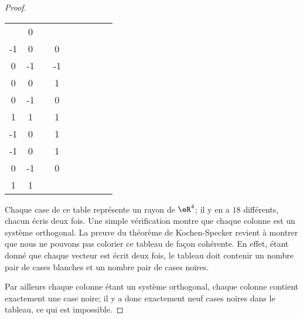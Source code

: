 \begin{proof}
\begin{tabular}{c|c|c|c|c|c|c|c|c}
\begin{matrix}
			1  & 0 \\
			-1 & 0
		\end{matrix}\)
		 &
		\( \begin{matrix}
			1 & 0  \\
			0 & -1
		\end{matrix}\)
		 &
		\( \begin{matrix}
			1 & -1 \\
			0 & 0
		\end{matrix}\)
		 &
		\( \begin{matrix}
			0 & 1  \\
			0 & -1
		\end{matrix}\)
		 &
		\( \begin{matrix}
			0 & 0 \\
			1 & 1
		\end{matrix}\)
		 &
		\( \begin{matrix}
			0  & 1 \\
			-1 & 0
		\end{matrix}\)
		 &
		\( \begin{matrix}
			0  & 1 \\
			-1 & 0
		\end{matrix}\)
		 &
		\( \begin{matrix}
			0 & 1  \\
			0 & -1
		\end{matrix}\)
		 &
		\( \begin{matrix}
			0 & 0 \\
			1 & 1
		\end{matrix}\) \\
		\hline
	\end{tabular}

	Chaque case de ce table représente un rayon de \( \eR^4\); il y en a \( 18\) différents, chacun écris deux fois. Une simple vérification montre que chaque colonne est un système orthogonal. La preuve du théorème de Kochen-Specker revient à montrer que nous ne pouvons pas colorier ce tableau de façon cohérente. En effet, étant donné que chaque vecteur est écrit deux fois, le tableau doit contenir un nombre pair de cases blanches et un nombre pair de cases noires.

	Par ailleurs chaque colonne étant un système orthogonal, chaque colonne contient exactement une case noire; il y a donc exactement neuf cases noires dans le tableau, ce qui est impossible.

\end{proof}


